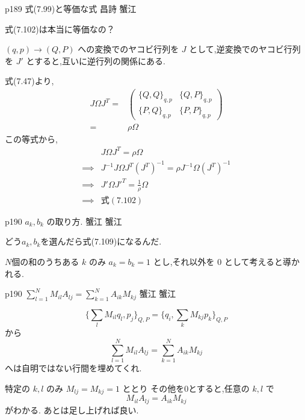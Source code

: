 \documentclass{jlreq}
\newcommand{\qsep}{%
  \tcblower
  \medskip
}
\begin{document}
\begin{qboxok}
  {p189 式(7.99)と等価な式}
  {昌詩}
  {蟹江}

  式(7.102)は本当に等価なの？

  \qsep

  \( (q,p) \to (Q,P) \) への変換でのヤコビ行列を \( J \) 
  として,逆変換でのヤコビ行列を \( J' \) とすると,互いに逆行列の関係にある.

  式(7.47)より,
  \begin{align*}
    J Ω J^T 
    =&
    \begin{pmatrix}
      \{Q,Q\}_{q,p} & \{Q,P\}_{q,p}\\
      \{P,Q\}_{q,p} & \{P,P\}_{q,p}   
    \end{pmatrix}\\
    =&\rho Ω
  \end{align*}
  この等式から,
  \begin{align*}
    & J Ω J^T = \rho Ω\\
    \implies & J^{-1} J Ω J^T (J^T)^{-1} = \rho   J^{-1}  Ω  (J^T)^{-1}\\
    \implies & J' Ω J'^T = \frac{1}{\rho} Ω\\
    \implies & \text{式}(7.102) 
  \end{align*} 

\end{qboxok}

\begin{qboxok}
  {p190 \( a_k,b_k \) の取り方.}
  {蟹江}
  {蟹江}

  どう\( a_k,b_k \)を選んだら式(7.109)になるんだ.

  \qsep

  \( N \)個の和のうちある \( k \) のみ
 \( a_k = b_k =1 \) とし,それ以外を 
 \( 0 \) として考えると導かれる.

\end{qboxok}

\begin{qboxok}
  {p190 \( \sum_{l=1}^{N} M_{il} A_{lj} = \sum_{k=1}^{N} A_{ik} M_{kj}  \) }
  {蟹江}
  {蟹江}

  \[ \{\sum_{l} M_{il} q_l , p_j  \}_{Q,P} = \{q_i , \sum_{k} M_{kj} p_k  \}_{Q,P}   \]
  から
  \[ \sum_{l=1}^{N} M_{il} A_{lj} = \sum_{k=1}^{N} A_{ik} M_{kj} \]
  へは自明ではない行間を埋めてくれ.

  \qsep

  特定の \( k,l \) のみ \( M_{lj} = M_{kj} = 1   \) ととり
  その他を0とすると,任意の \( k,l \) で
  \[M_{il} A_{lj} = A_{ik} M_{kj}\]
  がわかる.
  あとは足し上げれば良い.

\end{qboxok}
\end{document}
